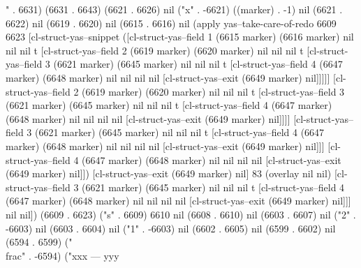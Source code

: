 " . 6631) (6631 . 6643) (6621 . 6626) nil ("x" . -6621) ((marker) . -1) nil (6621 . 6622) nil (6619 . 6620) nil (6615 . 6616) nil (apply yas--take-care-of-redo 6609 6623 [cl-struct-yas--snippet ([cl-struct-yas--field 1 (6615 marker) (6616 marker) nil nil nil t [cl-struct-yas--field 2 (6619 marker) (6620 marker) nil nil nil t [cl-struct-yas--field 3 (6621 marker) (6645 marker) nil nil nil t [cl-struct-yas--field 4 (6647 marker) (6648 marker) nil nil nil nil [cl-struct-yas--exit (6649 marker) nil]]]]] [cl-struct-yas--field 2 (6619 marker) (6620 marker) nil nil nil t [cl-struct-yas--field 3 (6621 marker) (6645 marker) nil nil nil t [cl-struct-yas--field 4 (6647 marker) (6648 marker) nil nil nil nil [cl-struct-yas--exit (6649 marker) nil]]]] [cl-struct-yas--field 3 (6621 marker) (6645 marker) nil nil nil t [cl-struct-yas--field 4 (6647 marker) (6648 marker) nil nil nil nil [cl-struct-yas--exit (6649 marker) nil]]] [cl-struct-yas--field 4 (6647 marker) (6648 marker) nil nil nil nil [cl-struct-yas--exit (6649 marker) nil]]) [cl-struct-yas--exit (6649 marker) nil] 83 (overlay nil nil) [cl-struct-yas--field 3 (6621 marker) (6645 marker) nil nil nil t [cl-struct-yas--field 4 (6647 marker) (6648 marker) nil nil nil nil [cl-struct-yas--exit (6649 marker) nil]]] nil nil]) (6609 . 6623) ("s" . 6609) 6610 nil (6608 . 6610) nil (6603 . 6607) nil ("2" . -6603) nil (6603 . 6604) nil ("1" . -6603) nil (6602 . 6605) nil (6599 . 6602) nil (6594 . 6599) ("\\frac" . -6594) ("xxx
---
yyy

